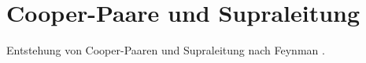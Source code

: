\chapter{Cooper-Paare und Supraleitung\label{chapter:supraleitung}}
\begin{refsection}



Entstehung von Cooper-Paaren und Supraleitung nach Feynman
\cite{supraleitung:feynman}.

\printbibliography[heading=subbibliography]
\end{refsection}

